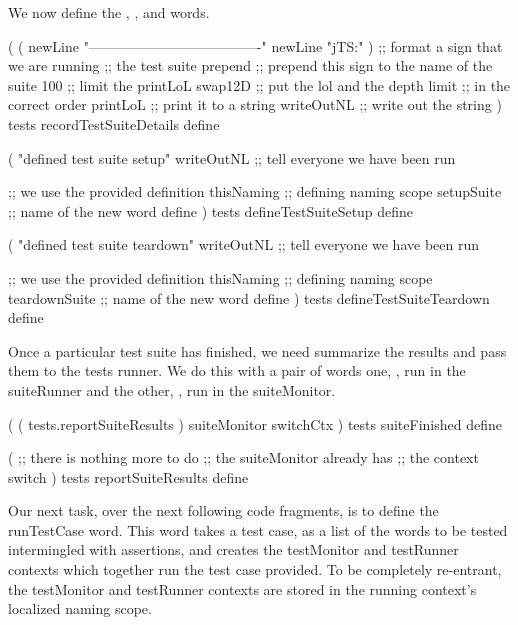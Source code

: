 We now define the , 
, and  words. 

\startJoylolCode
(
  (
    newLine
    "-------------------------------------"
    newLine
    "jTS:"
  )           ;; format a sign that we are running
              ;; the test suite
  prepend     ;; prepend this sign to the name of the suite
  100         ;; limit the printLoL
  swap12D     ;; put the lol and the depth limit 
              ;; in the correct order
  printLoL    ;; print it to a string
  writeOutNL  ;; write out the string
)
tests
recordTestSuiteDetails
define
\stopJoylolCode

\startJoylolCode
(
  "defined test suite setup"
  writeOutNL  ;; tell everyone we have been run

              ;; we use the provided definition
  thisNaming  ;; defining naming scope
  setupSuite  ;; name of the new word
  define
)
tests
defineTestSuiteSetup
define
\stopJoylolCode

\startJoylolCode
(
  "defined test suite teardown"
  writeOutNL    ;; tell everyone we have been run

                ;; we use the provided definition
  thisNaming    ;; defining naming scope
  teardownSuite ;; name of the new word
  define
)
tests
defineTestSuiteTeardown
define
\stopJoylolCode

Once a particular test suite has finished, we need summarize the results 
and pass them to the tests runner. We do this with a pair of words one, 
, run in the suiteRunner and the other, 
, run in the suiteMonitor. 

\startJoylolCode
(
  ( tests.reportSuiteResults )
  suiteMonitor
  switchCtx
)
tests
suiteFinished
define
\stopJoylolCode

\startJoylolCode
(
          ;; there is nothing more to do
          ;; the suiteMonitor already has
          ;; the context switch 
)
tests
reportSuiteResults
define
\stopJoylolCode

\stopTestSuite

\startTestSuite[runTestCase]

Our next task, over the next following code fragments, is to define the 
runTestCase word. This word takes a test case, as a list of the words to 
be tested intermingled with assertions, and creates the testMonitor and 
testRunner contexts which together run the test case provided. To be 
completely re-entrant, the testMonitor and testRunner contexts are stored 
in the running context's localized naming scope. 

